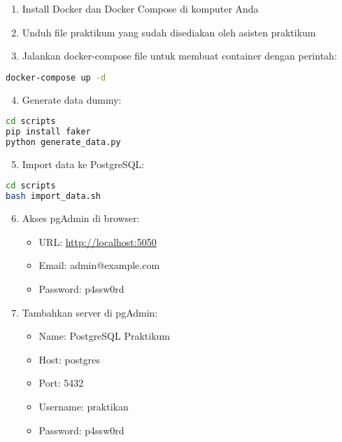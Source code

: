 \begin{enumerate}
    \item Install Docker dan Docker Compose di komputer Anda
    \item Unduh file praktikum yang sudah disediakan oleh asisten praktikum
    \item Jalankan docker-compose file untuk membuat container dengan perintah:
\end{enumerate}

\begin{lstlisting}[language=bash]
docker-compose up -d
\end{lstlisting}

\begin{enumerate}
    \setcounter{enumi}{3}
    \item Generate data dummy:
\end{enumerate}

\begin{lstlisting}[language=bash]
cd scripts
pip install faker
python generate_data.py
\end{lstlisting}

\begin{enumerate}
    \setcounter{enumi}{4}
    \item Import data ke PostgreSQL:
\end{enumerate}

\begin{lstlisting}[language=bash]
cd scripts
bash import_data.sh
\end{lstlisting}

\begin{enumerate}
    \setcounter{enumi}{5}
    \item Akses pgAdmin di browser:
    \begin{itemize}
        \item URL: \url{http://localhost:5050}
        \item Email: admin@example.com
        \item Password: p4ssw0rd
    \end{itemize}

    \item Tambahkan server di pgAdmin:
    \begin{itemize}
        \item Name: PostgreSQL Praktikum
        \item Host: postgres
        \item Port: 5432
        \item Username: praktikan
        \item Password: p4ssw0rd
    \end{itemize}
\end{enumerate}

